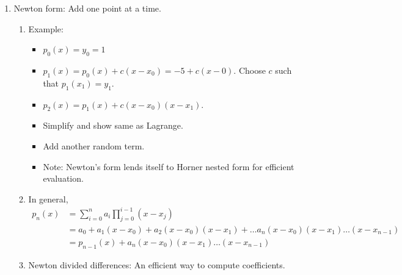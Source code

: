 \documentclass{article}
\theoremstyle{remark}
\begin{document}
\begin{enumerate}
\item Newton form: Add one point at a time.
\begin{enumerate}

\item Example:
\begin{itemize}
\item $p_0(x) = y_0= 1$
\item $p_1(x) = p_0(x) + c(x-x_0) = -5 + c(x-0)$. Choose $c$ such that $p_1(x_1)=y_1$. 
\item $p_2(x) = p_1(x) + c(x-x_0)(x-x_1)$. 
\item Simplify and show same as Lagrange.
\item Add another random term. 
\item Note: Newton's form lends itself to Horner nested form for efficient evaluation.
\end{itemize}

\item In general, 
\begin{align*}
p_n(x) &= \sum_{i=0}^n a_i \prod_{j=0}^{i-1} (x-x_j) \\
&= a_0 + a_1(x-x_0) + a_2 (x-x_0)(x-x_1) + \dots a_n(x-x_0)(x-x_1)\dots (x-x_{n-1}) \\
&= p_{n-1}(x) + a_n(x-x_0)(x-x_1)\dots (x-x_{n-1}) 
\end{align*}

\item Newton divided differences: An efficient way to compute coefficients.


\end{enumerate}
\end{enumerate}
\end{document}
